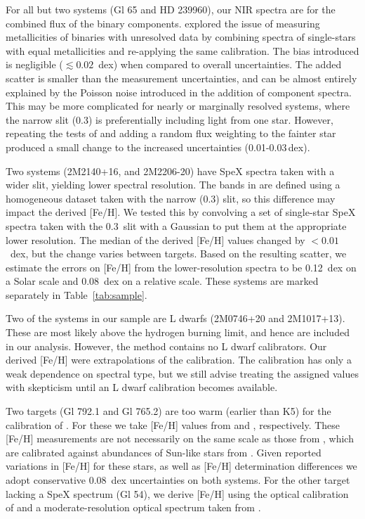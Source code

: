 \documentclass[twocolumn]{aastex62}
\begin{document}
For all but two systems (Gl 65 and HD 239960), our NIR spectra are for the combined flux of the binary components. \citet{Mann2014} explored the issue of measuring metallicities of binaries with unresolved data by combining spectra of single-stars with equal metallicities and re-applying the same calibration. The bias introduced is negligible ($\lesssim0.02$~dex) when compared to overall uncertainties. The added scatter is smaller than the measurement uncertainties, and can be almost entirely explained by the Poisson noise introduced in the addition of component spectra. This may be more complicated for nearly or marginally resolved systems, where the narrow slit (0.3\arcsec) is preferentially including light from one star. However, repeating the tests of \citet{Mann2014} and adding a random flux weighting to the fainter star produced a small change to the increased uncertainties (0.01-0.03\,dex).

Two systems (2M2140+16, and 2M2206-20) have SpeX spectra taken with a wider slit, yielding lower spectral resolution. The bands in \citet{Mann2014} are defined using a homogeneous dataset taken with the narrow (0.3\arcsec) slit, so this difference may impact the derived [Fe/H]. We tested this by convolving a set of single-star SpeX spectra taken with the 0.3\arcsec\ slit with a Gaussian to put them at the appropriate lower resolution. The median of the derived [Fe/H] values changed by $<0.01$~dex, but the change varies between targets. Based on the resulting scatter, we estimate the errors on [Fe/H] from the lower-resolution spectra to be 0.12~dex on a Solar scale and 0.08~dex on a relative scale. These systems are marked separately in Table~\ref{tab:sample}. 

Two of the systems in our sample are L dwarfs (2M0746+20 and 2M1017+13). These are most likely above the hydrogen burning limit, and hence are included in our analysis. However, the \citet{Mann2014} method contains no L dwarf calibrators. Our derived [Fe/H] were extrapolations of the \citet{Mann2014} calibration. The \citet{Mann2014} calibration has only a weak dependence on spectral type, but we still advise treating the assigned values with skepticism until an L dwarf calibration becomes available. 

Two targets (Gl 792.1 and Gl 765.2) are too warm (earlier than K5) for the calibration of \citet{Mann2013a}. For these we take [Fe/H] values from \citet{2011A&A...530A.138C} and \citet{2010A&ARv..18...67T}, respectively. These [Fe/H] measurements are not necessarily on the same scale as those from \citet{Mann2013a}, which are calibrated against abundances of Sun-like stars from \citet{2015ApJ...805..126B,2016ApJS..225...32B}. Given reported variations in [Fe/H] for these stars, as well as [Fe/H] determination differences \citep{2014AJ....148...54H,2016ApJS..226....4H} we adopt conservative 0.08~dex uncertainties on both systems. For the other target lacking a SpeX spectrum (Gl 54), we derive [Fe/H] using the optical calibration of \citet{Mann2013a} and a moderate-resolution optical spectrum taken from \citet{Gaidos2014}.
\end{document}
